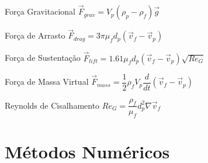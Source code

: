 \documentclass{beamer}
\begin{document}
\begin{frame}
  \frametitle{\subsecname}
  
  \begin{minipage}{.45\textwidth}
    \begin{block}{Força Gravitacional}
      \centering
      $\vec{F}_{grav} = V_p\left(\rho_p -\rho_f \right) \vec{g}$
    \end{block}
    
    \begin{block}{Força de Arrasto}
      \centering
      $\vec{F}_{drag} = 3 \pi \mu_f d_p \left(\vec{v}_{f} - \vec{v}_{p} \right)$
    \end{block}
  \end{minipage}
  \hfill
  \begin{minipage}{.51\textwidth}
    \begin{block}{Força de Sustentação}
      \centering
      $\vec{F}_{lift} = 1.61 \mu_f d_p \left(\vec{v}_{f} - \vec{v}_{p} \right) \sqrt{{Re}_G}$
    \end{block}
    
    \begin{block}{Força de Massa Virtual}
      \centering
      $\vec{F}_{mass} = \dfrac{1}{2} \rho_f V_p \dfrac{d}{dt}\left(\vec{v}_{f} - \vec{v}_{p} \right)$
    \end{block}
  \end{minipage}
  
  \begin{block}{Reynolds de Cisalhamento}
    \centering
    $Re_G = \dfrac{\rho_f}{\mu_f} d_p^2 \nabla \vec{v}_f$
  \end{block}
\end{frame}

\section{Métodos Numéricos}
\end{document}
